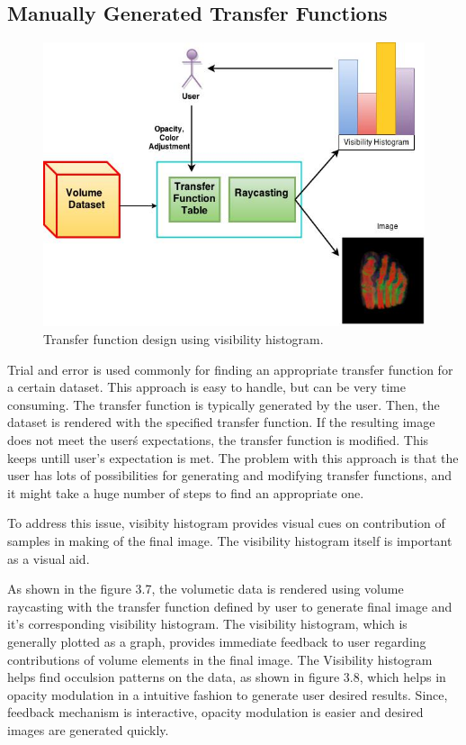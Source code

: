 \subsection{Manually Generated Transfer Functions}

\begin{figure}
\centering
\includegraphics[width=350pt]{Images/VH_pipeline.jpg}
\caption{\label{fig:ray_cast1.jpg} Transfer function design using visibility histogram.}
\end{figure}

Trial and error is used commonly for finding an appropriate transfer function for a certain dataset. This approach is easy to handle, but can be very time consuming. The transfer function is typically generated by the user. Then, the dataset is rendered with the specified transfer function. If the resulting image does not meet the user\'s expectations, the transfer function is modified. This keeps untill user's expectation is met. The problem with this approach is that the user has lots of possibilities for generating and modifying transfer functions, and it might take a huge number of steps to find an appropriate one. 

To address this issue, visibity histogram provides visual cues on contribution of samples in making of the final image. The visibility histogram itself is important as a visual aid. 

As shown in the figure 3.7, the volumetic data is rendered using volume raycasting with the transfer function defined by user to generate final image and it's corresponding visibility histogram. The visibility histogram, which is generally plotted as a graph, provides immediate feedback to user regarding contributions of volume elements in the final image. The Visibility histogram helps find occulsion patterns on the data, as shown in figure 3.8, which helps in opacity modulation in a intuitive fashion to generate user desired results. Since, feedback mechanism is interactive, opacity modulation is easier and desired images are generated quickly.    


